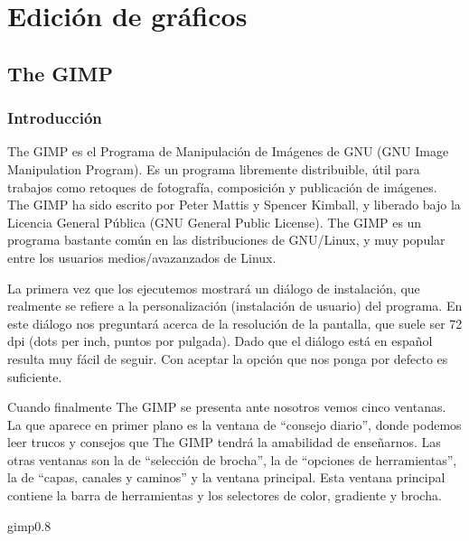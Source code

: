 
\chapter{Edición de gráficos}
\label{graficos.tex}

\section{The GIMP}

\subsection{Introducción}

{\sf The GIMP} es el Programa  de Manipulación de Imágenes de GNU (GNU
Image Manipulation  Program). Es  un programa libremente distribuible,
útil  para  trabajos  como   retoques  de  fotografía,  composición  y
publicación  de imágenes.  {\sf The  GIMP} ha  sido escrito  por Peter
Mattis y Spencer Kimball, y liberado bajo  la Licencia General Pública
(GNU General Public  License). {\sf The GIMP} es  un programa bastante
común  en las  distribuciones de  GNU/Linux, y  muy popular  entre los
usuarios medios/avazanzados de Linux.

La primera vez que los  ejecutemos mostrará un diálogo de instalación,
que realmente se refiere a la personalización (instalación de usuario)
del programa. En  este diálogo nos preguntará acerca  de la resolución
de  la pantalla,  que suele  ser  72 dpi  (dots per  inch, puntos  por
pulgada). Dado  que el diálogo  está en  español resulta muy  fácil de
seguir. Con aceptar la opción que nos ponga por defecto es suficiente.

Cuando finalmente {\sf The GIMP} se presenta ante nosotros vemos cinco
ventanas. La  que aparece en primer  plano es la ventana  de ``consejo
diario'',  donde podemos  leer trucos  y consejos  que {\sf  The GIMP}
tendrá  la amabilidad  de enseñarnos.  Las  otras ventanas  son la  de
``selección de  brocha'', la  de ``opciones  de herramientas'',  la de
``capas,  canales y  caminos'' y  la ventana  principal. Esta  ventana
principal contiene la barra de herramientas y los selectores de color,
gradiente y brocha.

\begin{figura}{gimp}{0.8}
\caption{Aspecto de The GIMP al usarlo por primera vez}
\end{figura}

